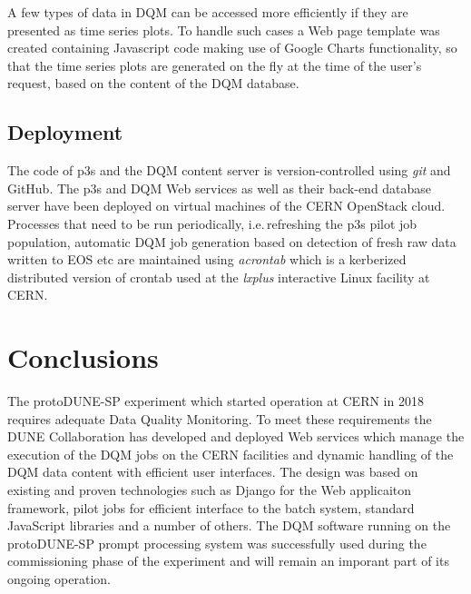 \documentclass{webofc}
\newcommand{\pd}{protoDUNE\xspace}
\begin{document}
A few types of data in DQM can be accessed more efficiently if they are presented as time
series plots. To handle such cases a Web page template was created containing
Javascript code making use of Google Charts functionality, so that the time series
plots are generated on the fly at the time of the user's request, based on the content
of the DQM database.

\subsection{Deployment}

The code of p3s and the DQM content server is version-controlled using \textit{git}
and GitHub. The p3s and DQM Web services as well as their back-end database server have been deployed on
virtual machines of the CERN OpenStack cloud. Processes that need to be run periodically,
i.e.\,refreshing the p3s pilot job population, automatic DQM job generation based on detection
of fresh raw data written to EOS etc are maintained using \textit{acrontab} which is a kerberized
distributed version of crontab used at the \textit{lxplus} interactive Linux facility at CERN.

\section{Conclusions}

The \pd-SP experiment which started operation at CERN in 2018 requires adequate Data
Quality Monitoring. To meet these requirements the DUNE Collaboration has developed
and deployed Web services which manage the execution of the DQM jobs on the CERN
facilities and dynamic handling of the DQM data content with efficient user interfaces.
The design was based on existing and proven technologies such as Django
for the Web applicaiton framework,  pilot jobs for efficient interface to
the batch system, standard  JavaScript libraries and a number of others. The DQM software
running on the \pd-SP prompt processing system was  successfully used during
the commissioning phase of the experiment and will remain an imporant part
of its ongoing operation.

%
% 
%
%
\end{document}

